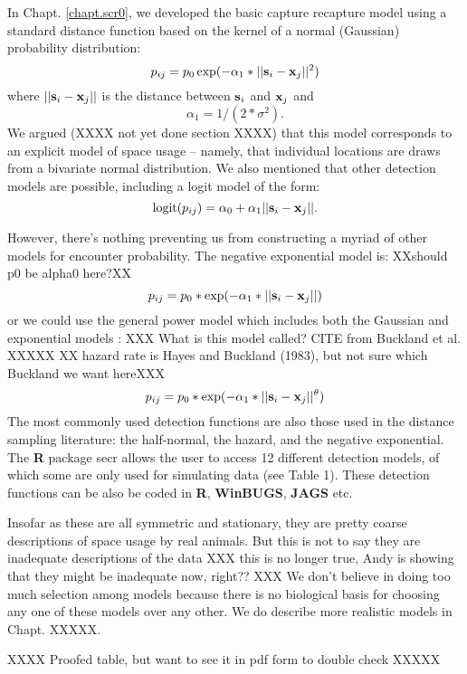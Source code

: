 In Chapt. \ref{chapt.scr0}, we developed the basic capture recapture model using  a
standard distance function based on the kernel of a normal (Gaussian) probability
distribution:
\[
p_{ij} = p_{0} \exp(-\alpha_{1} *||{\bf s}_{i}-{\bf x}_{j}||^2)
\]
where $||{\bf s}_{i}-{\bf x}_{j}||$ is the distance between ${\bf
  s}_{i}$ and ${\bf x}_{j}$ and
\[
\alpha_{1} = 1/(2*\sigma^2).
\]
We argued (XXXX not yet done section XXXX) that this model 
corresponds to an explicit model of space usage -- namely, that
individual locations are draws from a bivariate normal
distribution. We also mentioned that other detection models are
possible, including a logit model of the form:
\begin{equation}
	\mbox{logit}(p_{ij}) = \alpha_{0} + \alpha_1 ||{\bf s}_{i}-{\bf x}_{j} ||.
\label{covariates.eq.logit}
\end{equation}

However, there's nothing preventing us from constructing a myriad of
other models for encounter probability.
The negative exponential model is: XXshould p0 be alpha0 here?XX
\[
p_{ij} = p_{0}*\exp(-\alpha_{1} *||{\bf s}_{i}-{\bf x}_{j}||)
\]
or we could use the general power model which includes both the
Gaussian and exponential models \citep{russell_etal:2012}: XXX What is
this model called? CITE from Buckland et al. XXXXX
XX hazard rate is Hayes and Buckland (1983), but not sure which Buckland we want hereXXX
\[
p_{ij} = p_{0}*\exp(-\alpha_{1} *||{\bf s}_{i}-{\bf x}_{j}||^{\theta} )
\]
The most commonly used detection
functions are also those used in the distance sampling literature: the
half-normal, the hazard, and the negative exponential.  
The {\bf R} package
secr allows the user to access 12 different detection models, of which
some are only used for simulating data (see Table 1).  These detection
functions can be also be coded in {\bf R}, {\bf WinBUGS},
{\bf JAGS} etc.  

Insofar as these are all symmetric and stationary, they are pretty
coarse descriptions of space usage by real animals. But this is not to
say they are inadequate descriptions of the data XXX this is no longer true, Andy
is showing that they might be inadequate now, right?? XXX
We don't believe in doing too much
selection among models because there is no biological basis for
choosing any one of these models over any other. We do describe more
realistic models in Chapt. XXXXX.



XXXX  Proofed table, but want to see it in pdf form to double check XXXXX

